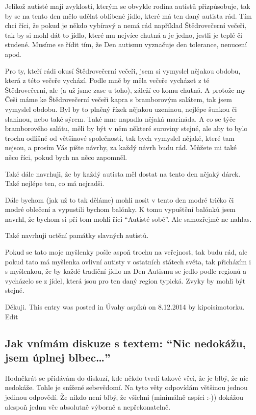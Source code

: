 \documentclass[DIV=calc, paper=a4, fontsize=11pt, twocolumn]{scrartcl}	 %
\begin{document}
Jelikož autisté mají zvyklosti, kterým se obvykle rodina autistů
přizpůsobuje, tak by se na tento den mělo udělat oblíbené jídlo, které
má ten daný autista rád. Tím chci říci, že pokud je někdo vybíravý a
nemá rád například Štědrovečerní večeři, tak by si mohl dát to jídlo,
které mu nejvíce chutná a je jedno, jestli je teplé či studené. Musíme
se řídit tím, že Den autismu vyznačuje den tolerance, nenucení apod.

Pro ty, kteří rádi okusí Štědrovečerní večeři, jsem si vymyslel
nějakou obdobu, která z této večeře vychází. Podle mně by měla večeře
vycházet z té Štědrovečerní, ale (a už jsme zase u toho), záleží co
komu chutná. A protože my Češi máme ke Štědrovečerní večeři kapra s
bramborovým salátem, tak jsem vymyslel obdobu. Byl by to plněný řízek
nějakou uzeninou, nejlépe šunkou či slaninou, nebo také sýrem. Také
mne napadla nějaká marináda. A co se týče bramborového salátu, měli by
být v něm některé suroviny stejné, ale aby to bylo trochu odlišné od
většinové společnosti, tak bych vymyslel nějaké, které tam nejsou, a
prosím Vás pište návrhy, za každý návrh budu rád. Můžete mi také něco
říci, pokud bych na něco zapomněl.

Také dále navrhuji, že by každý autista měl dostat na tento den nějaký
dárek. Také nejlépe ten, co má nejradši.

Dále bychom (jak už to tak děláme) mohli nosit v tento den modré
tričko či modré oblečení a vypustili bychom balónky. K tomu vypuštění
balónků jsem navrhl, že bychom si při tom mohli říci “Autisté
sobě”. Ale samozřejmě ne nahlas.

Také navrhuji uctění památky slavných autistů.

Pokud se tato moje myšlenky pošle aspoň trochu na veřejnost, tak budu
rád, ale pokud tato má myšlenka ovlivní autisty v ostatních státech
světa, tak přicházím i s myšlenkou, že by každé tradiční jídlo na Den
Autismu se jedlo podle regionů a vycházelo se z jídel, která jsou pro
ten daný region typická. Zvyky by mohli být stejné.

Děkuji.
This entry was posted in Úvahy aspíků on 8.12.2014 by
kipoisimotorku. Edit

\subsection*{Jak vnímám diskuze s textem: “Nic nedokážu, jsem úplnej blbec…”}

Hodněkrát se přidávám do diskuzí, kde někdo tvrdí takové věci, že je
blbý, že nic nedokáže. Tohle je snížené sebevědomí. Na tyto věty
odpovídám většinou jednou jedinou odpovědí. Že nikdo není blbý, že
všichni (minimálně aspíci :-)) dokážou alespoň jednu věc absolutně
výborně a nepřekonatelně.
\end{document}
